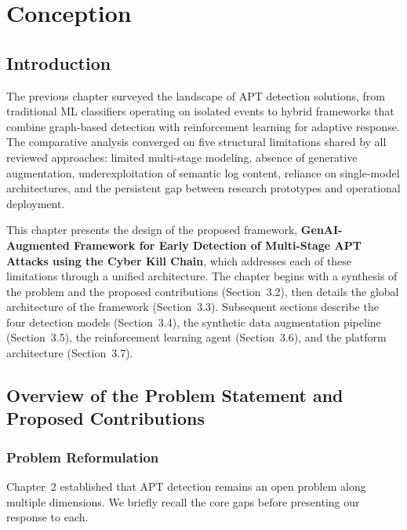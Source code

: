 \chapter{Conception}
\label{chap:conception}
\section{Introduction}

The previous chapter surveyed the landscape of APT detection solutions, from traditional ML classifiers operating on isolated events to hybrid frameworks that combine graph-based detection with reinforcement learning for adaptive response. The comparative analysis converged on five structural limitations shared by all reviewed approaches: limited multi-stage modeling, absence of generative augmentation, underexploitation of semantic log content, reliance on single-model architectures, and the persistent gap between research prototypes and operational deployment.

This chapter presents the design of the proposed framework, \textbf{GenAI-Augmented Framework for Early Detection of Multi-Stage APT Attacks using the Cyber Kill Chain}, which addresses each of these limitations through a unified architecture. The chapter begins with a synthesis of the problem and the proposed contributions (Section~3.2), then details the global architecture of the framework (Section~3.3). Subsequent sections describe the four detection models (Section~3.4), the synthetic data augmentation pipeline (Section~3.5), the reinforcement learning agent (Section~3.6), and the platform architecture (Section~3.7).


\section{Overview of the Problem Statement and Proposed Contributions}

\subsection{Problem Reformulation}

Chapter~2 established that APT detection remains an open problem along multiple dimensions. We briefly recall the core gaps before presenting our response to each.


